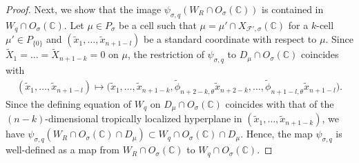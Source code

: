 \documentclass[pdftex]{sigma}
\numberwithin{equation}{section}
\begin{document}
\begin{proof}
Next, we show that the image $\psi_{\sigma,q}(W_R \cap O_\sigma({\mathbb C}))$ is contained in $W_q \cap O_\sigma({\mathbb C})$. Let $\mu \in P_\sigma$ be a cell such that $\mu = \mu' \cap X_{{\mathcal F}',\sigma}({\mathbb C})$ for a $k$-cell $\mu' \in P_{\{0\}}$ and $(\tilde{x}_1, \dots, \tilde{x}_{n+1-l})$ be a standard coordinate with respect to $\mu$. Since $\widetilde{X}_1=\dots=\widetilde{X}_{n+1-k}=0$ on $\mu$, the restriction of $\psi_{\sigma,q}$ to $D_\mu \cap O_\sigma({\mathbb C})$ coincides with
\begin{gather*}%
(\tilde{x}_1, \dots, \tilde{x}_{n+1-l}) \mapsto
\big(\tilde{x}_1, \dots, \tilde{x}_{n+1-k}, \tilde{\phi}_{n+2-k,\theta}\tilde{x}_{n+2-k}, \dots, \tilde{\phi}_{n+1-l,\theta} \tilde{x}_{n+1-l}\big).
\end{gather*}
Since the def\/ining equation of $W_q$ on $D_\mu \cap O_\sigma({\mathbb C})$ coincides with that of the $(n-k)$-dimensional tropically localized hyperplane in $(\tilde{x}_1, \dots, \tilde{x}_{n+1-k})$, we have $\psi_{\sigma,q} \left(W_R \cap O_\sigma({\mathbb C}) \cap D_\mu \right) \subset W_q \cap O_\sigma({\mathbb C}) \cap D_\mu$. Hence, the map $\psi_{\sigma,q}$ is well-def\/ined as a map from $W_R \cap O_\sigma({\mathbb C})$ to $W_q \cap O_\sigma({\mathbb C})$.
\end{proof}
\end{document}
